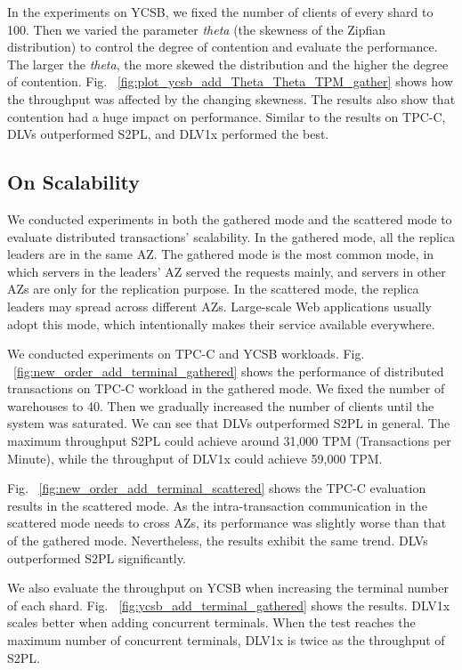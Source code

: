 \documentclass[conference]{IEEEtran}
\begin{document}
In the experiments on YCSB, we fixed the number of clients of every shard to 100.
Then we varied the parameter \emph{theta} (the skewness of the Zipfian distribution) to control the degree of contention and evaluate the performance.
The larger the \emph{theta}, the more skewed the distribution and the higher the degree of contention. 
Fig. ~\ref{fig:plot_ycsb_add_Theta_Theta_TPM_gather} shows how the throughput was affected by the changing skewness.
The results also show that contention had a huge impact on performance.
Similar to the results on TPC-C, DLVs outperformed S2PL, and DLV1x performed the best.

\subsection{On Scalability}

We conducted experiments in both the gathered mode and the scattered mode to evaluate distributed transactions' scalability.
In the gathered mode, all the replica leaders are in the same AZ. 
The gathered mode is the most common mode, in which servers in the leaders' AZ served the requests mainly, and servers in other AZs are only for the replication purpose. 
In the scattered mode, the replica leaders may spread across different AZs. 
Large-scale Web applications usually adopt this mode, which intentionally makes their service available everywhere.

We conducted experiments on TPC-C and YCSB workloads. 
Fig. ~\ref{fig:new_order_add_terminal_gathered} shows the performance of distributed transactions on TPC-C workload in the gathered mode.
We fixed the number of warehouses to 40. 
Then we gradually increased the number of clients until the system was saturated. 
We can see that DLVs outperformed S2PL in general. 
The maximum throughput S2PL could achieve around 31,000 TPM (Transactions per Minute), 
while the throughput of DLV1x could achieve 59,000 TPM.


Fig. ~\ref{fig:new_order_add_terminal_scattered}  shows the TPC-C evaluation results in the scattered mode. 
As the intra-transaction communication in the scattered mode needs to cross AZs, its performance was slightly worse than that of the gathered mode.
Nevertheless, the results exhibit the same trend. DLVs outperformed S2PL significantly.

We also evaluate the throughput on YCSB when increasing the terminal number of each shard.
Fig. ~\ref{fig:ycsb_add_terminal_gathered} shows the results.
DLV1x scales better when adding concurrent terminals.
When the test reaches the maximum number of concurrent terminals, DLV1x is twice as the throughput of S2PL.
\end{document}
